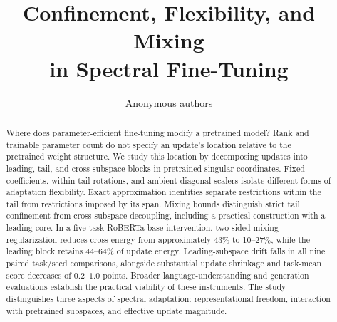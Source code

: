 \documentclass{article}
\title{Confinement, Flexibility, and Mixing\\in Spectral Fine-Tuning}
\author{Anonymous authors}
\begin{document}
\maketitle

\begin{abstract}
Where does parameter-efficient fine-tuning modify a pretrained model? Rank and trainable parameter count do not specify an update's location relative to the pretrained weight structure. We study this location by decomposing updates into leading, tail, and cross-subspace blocks in pretrained singular coordinates. Fixed coefficients, within-tail rotations, and ambient diagonal scalers isolate different forms of adaptation flexibility. Exact approximation identities separate restrictions within the tail from restrictions imposed by its span. Mixing bounds distinguish strict tail confinement from cross-subspace decoupling, including a practical construction with a leading core. In a five-task RoBERTa-base intervention, two-sided mixing regularization reduces cross energy from approximately 43\% to 10--27\%, while the leading block retains 44--64\% of update energy. Leading-subspace drift falls in all nine paired task/seed comparisons, alongside substantial update shrinkage and task-mean score decreases of $0.2$--$1.0$ points. Broader language-understanding and generation evaluations establish the practical viability of these instruments. The study distinguishes three aspects of spectral adaptation: representational freedom, interaction with pretrained subspaces, and effective update magnitude.
\end{abstract}










\clearpage
\appendix




\end{document}

